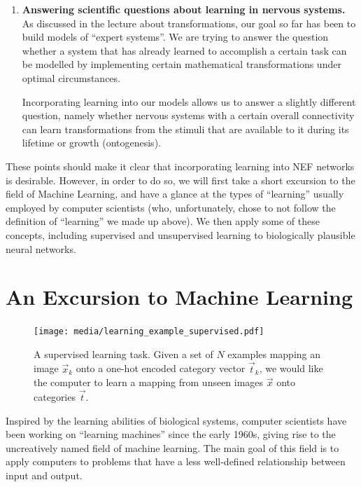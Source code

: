 \documentclass[10pt,letterpaper,oneside]{article}
\begin{document}
\begin{enumerate}[1.]
	\item \textbf{Answering scientific questions about learning in nervous systems.}\\
	As discussed in the lecture about transformations, our goal so far has been to build models of \enquote{expert systems}. We are trying to answer the question whether a system that has already learned to accomplish a certain task can be modelled by implementing certain mathematical transformations under optimal circumstances.

	Incorporating learning into our models allows us to answer a slightly different question, namely whether nervous systems with a certain overall connectivity can learn transformations from the stimuli that are available to it during its lifetime or growth (ontogenesis).
\end{enumerate}

These points should make it clear that incorporating learning into NEF networks is desirable. However, in order to do so, we will first take a short excursion to the field of Machine Learning, and have a glance at the types of \enquote{learning} usually employed by computer scientists (who, unfortunately, chose to not follow the definition of \enquote{learning} we made up above). We then apply some of these concepts, including supervised and unsupervised learning to biologically plausible neural networks.

\section{An Excursion to Machine Learning}

\begin{figure}
	\centering
	\texttt{[image: media/learning\_example\_supervised.pdf]}
	\caption{A supervised learning task. Given a set of $N$ examples mapping an image $\vec x_k$ onto a one-hot encoded category vector $\vec t_k$, we would like the computer to learn a mapping from unseen images $\vec x$ onto categories $\vec t$.}
	\label{fig:learning_example_supervised}
\end{figure}


Inspired by the learning abilities of biological systems, computer scientists have been working on \enquote{learning machines} since the early 1960s, giving rise to the uncreatively named field of machine learning. The main goal of this field is to apply computers to problems that have a less well-defined relationship between input and output.
\end{document}
